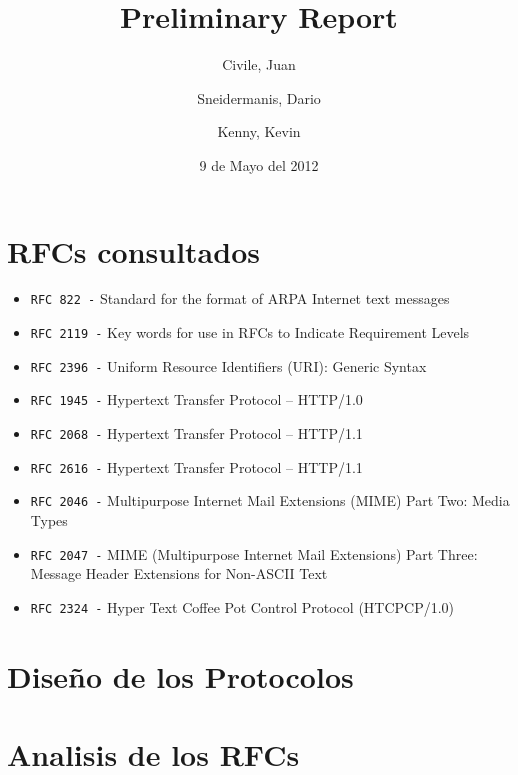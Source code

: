 \documentclass[11pt,a4paper,titlepage]{article}
\title{Preliminary Report}
\author{Civile, Juan \and Sneidermanis, Dario \and Kenny, Kevin}
\date{9 de Mayo del 2012}
\begin{document}
\newcommand{\awesome}[1]{\texttt{\large #1 -}}

\maketitle
\tableofcontents
\clearpage

\section{RFCs consultados}

\begin{itemize}

    \item \awesome{RFC 822}  Standard for the format of ARPA Internet text messages
    \item \awesome{RFC 2119} Key words for use in RFCs to Indicate Requirement Levels
    \item \awesome{RFC 2396} Uniform Resource Identifiers (URI): Generic Syntax
    \item \awesome{RFC 1945} Hypertext Transfer Protocol -- HTTP/1.0
    \item \awesome{RFC 2068} Hypertext Transfer Protocol -- HTTP/1.1
    \item \awesome{RFC 2616} Hypertext Transfer Protocol -- HTTP/1.1
    \item \awesome{RFC 2046} Multipurpose Internet Mail Extensions (MIME) Part Two: Media Types
    \item \awesome{RFC 2047} MIME (Multipurpose Internet Mail Extensions) Part Three: Message Header Extensions for Non-ASCII Text
    \item \awesome{RFC 2324} Hyper Text Coffee Pot Control Protocol (HTCPCP/1.0)

\end{itemize}

\section{Diseño de los Protocolos}

\section{Analisis de los RFCs}
\end{document}
